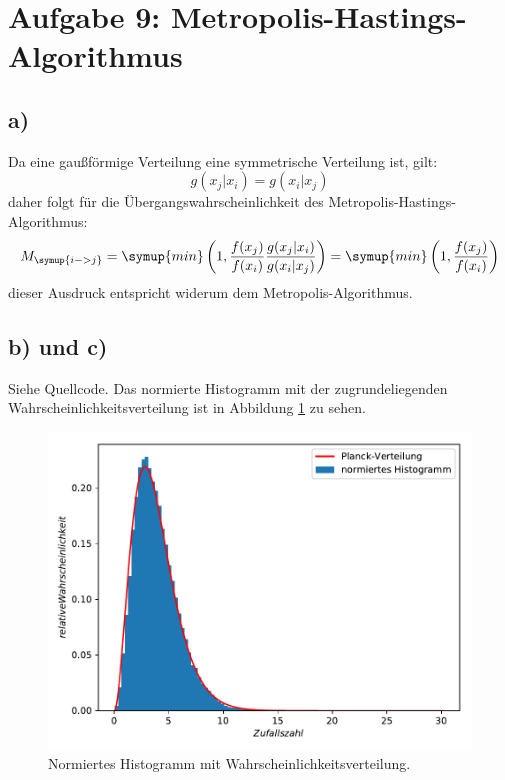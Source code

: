 \section{Aufgabe 9: Metropolis-Hastings-Algorithmus}
\subsection{a)}
Da eine gaußförmige Verteilung eine symmetrische Verteilung ist, gilt:
\begin{equation*}
  g(x_j|x_i) = g(x_i|x_j)
\end{equation*}
daher folgt für die Übergangswahrscheinlichkeit des Metropolis-Hastings-Algorithmus:
\begin{equation*}
  M_{\symup{i->j}} = \symup{min}\left(1, \frac{f(x_j)}{f(x_i)} \frac{g(x_j|x_i)}{g(x_i|x_j)}\right) =
  \symup{min}\left(1, \frac{f(x_j)}{f(x_i)}\right)
\end{equation*}
dieser Ausdruck entspricht widerum dem Metropolis-Algorithmus.

\subsection{b) und c)}
Siehe Quellcode.
Das normierte Histogramm mit der zugrundeliegenden Wahrscheinlichkeitsverteilung ist in Abbildung \ref{abb:1} zu sehen.
\begin{figure}[h]
  \centering
  \includegraphics{Aufgabe09/Metropolis.pdf}
  \caption{Normiertes Histogramm mit Wahrscheinlichkeitsverteilung.}
  \label{abb:1}
\end{figure}

